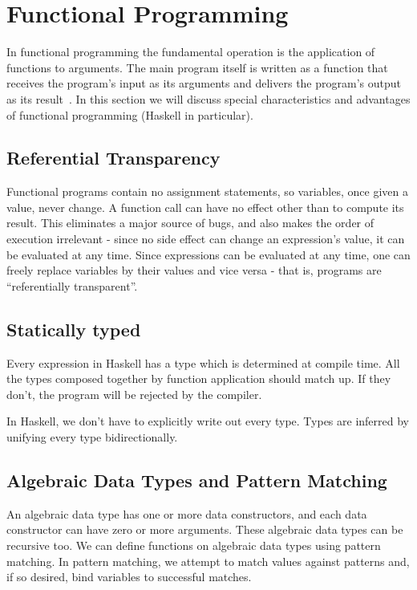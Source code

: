 \chapter{Functional Programming}
\label{chap:funcprog}

In functional programming the fundamental operation is the application of functions to arguments. The main program itself is written as a function that receives the program's input as its arguments and delivers the program's output as its result~\cite{hughes1989functional}.
In this section we will discuss special characteristics and advantages of functional programming (Haskell in particular).

\section{Referential Transparency}
Functional programs contain no assignment statements, so variables, once given a value, never change. A function call can have no effect other than to compute its result. This eliminates a major source of bugs, and also makes the order of execution irrelevant - since no side effect can change an expression's value, it can be evaluated at any time. Since expressions can be evaluated at any time, one can freely replace variables by their values and vice versa - that is, programs are ``referentially transparent''.

\section{Statically typed}
Every expression in Haskell has a type which is determined at compile time. All the types composed together by function application should match up. If they don't, the program will be rejected by the compiler.

In Haskell, we don't have to explicitly write out every type. Types are inferred by unifying every type bidirectionally.

\section{Algebraic Data Types and Pattern Matching}
An algebraic data type has one or more data constructors, and each data constructor can have zero or more arguments. These algebraic data types can be recursive too.
We can define functions on algebraic data types using pattern matching. In pattern matching, we attempt to match values against patterns and, if so desired, bind variables to successful matches.

